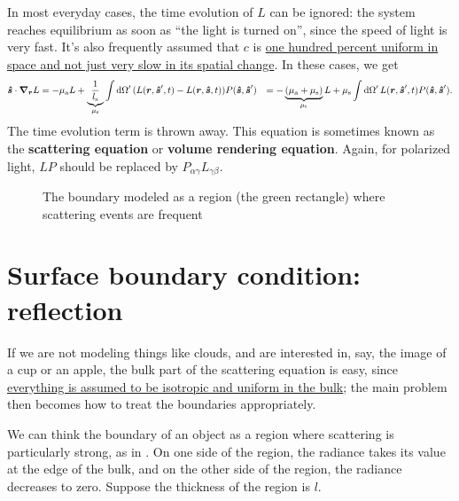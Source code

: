 \documentclass[hyperref, a4paper]{article}
\newcommand*{\concept}[1]{{\textbf{#1}}}
\def\\{}%
\begin{document}
In most everyday cases, the time evolution of $L$ can be ignored: 
the system reaches equilibrium as soon as ``the light is turned on'', 
since the speed of light is very fast. 
It's also frequently assumed that $c$ is 
\ul{one hundred percent uniform in space
and not just very slow in its spatial change}. 
In these cases, we get 
\begin{equation}
    \begin{aligned}
        \vu*{s} \cdot \grad_{\vb*{r}} L &= 
        - \mu_{\text{a}} L +
        \underbrace{\frac{1}{l_{\text{s}}}}_{\mu_{\text{s}}} \int \dd{\Omega'} 
        (L(\vb*{r}, \vu*{s}', t) - L(\vb*{r}, \vu*{s}, t)) P(\vu*{s}, \vu*{s}') \\
        &= - \underbrace{(\mu_{\text{a}} + \mu_{\text{s}})}_{\mu_{\text{t}}} L 
        + \mu_{\text{s}} \int \dd{\Omega'} 
        L(\vb*{r}, \vu*{s}', t) P(\vu*{s}, \vu*{s}') .
    \end{aligned}
    \label{eq:se-final}
\end{equation}
The time evolution term is thrown away. 
This equation is sometimes known as the \concept{scattering equation}
or \concept{volume rendering equation}.
Again, for polarized light, $L P$ should be replaced by $P_{\alpha \gamma} L_{\gamma \beta}$.

\begin{figure}
    \centering
    
    \caption{The boundary modeled as a region (the green rectangle) where scattering events are frequent}
    \label{fig:boundary-scattering}
\end{figure}

\section{Surface boundary condition: reflection}

If we are not modeling things like clouds, 
and are interested in, say, the image of a cup or an apple, 
the bulk part of the scattering equation is easy, 
since \ul{everything is assumed to be isotropic and uniform in the bulk};
the main problem then becomes how to treat the boundaries appropriately.

We can think the boundary of an object as a region where 
scattering is particularly strong, 
as in .
On one side of the region, 
the radiance takes its value at the edge of the bulk, 
and on the other side of the region, 
the radiance decreases to zero. 
Suppose the thickness of the region is $l$.
\end{document}
